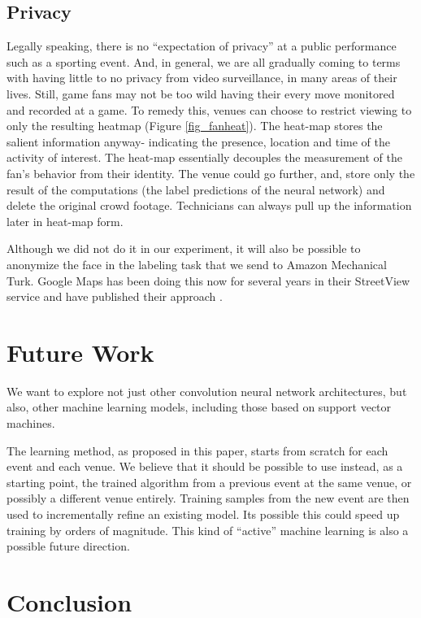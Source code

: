 \documentclass[times, 10pt,twocolumn]{article}
\begin{document}
\subsection{Privacy}
\label{sec_privacy}

Legally speaking, there is no ``expectation of privacy'' at a public performance such as a sporting event.   And, in general, we are all gradually coming to terms with having little to no privacy from video surveillance, in many areas of their lives.  Still, game fans may not be too wild having their every move monitored and recorded at a game.  To remedy this, venues can choose to restrict viewing to only the resulting heatmap (Figure \ref{fig_fanheat}).  The heat-map stores the salient information anyway- indicating the presence, location and time of the activity of interest.  The heat-map essentially decouples the measurement of the fan's behavior from their identity.  The venue could go further, and, store only the result of the computations (the label predictions of the neural network) and delete the original crowd footage.  Technicians can always pull up the information later in heat-map form.

Although we did not do it in our experiment, it will also be possible to anonymize the face in the labeling task that we send to Amazon Mechanical Turk.  Google Maps has been doing this now for several years in their StreetView service and have published their approach \cite{streetview}.

\section{Future Work}

We want to explore not just other convolution neural network architectures, but also, other machine learning models, including those based on support vector machines.

The learning method, as proposed in this paper, starts from scratch for each event and each venue.  We believe that it should be possible to use instead, as a starting point, the trained algorithm from a previous event at the same venue, or possibly a different venue entirely.  Training samples from the new event are then used to incrementally refine an existing model.  Its possible this could speed up training by orders of magnitude.  This kind of ``active'' machine learning is also a possible future direction.

\section{Conclusion}
\end{document}

